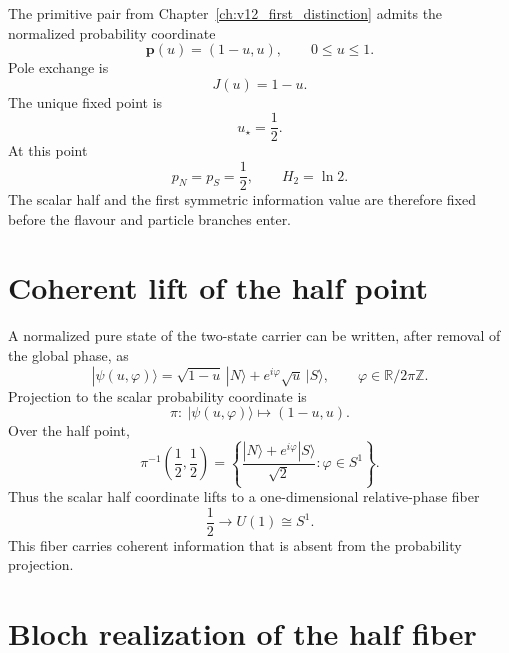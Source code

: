 The primitive pair from Chapter~\ref{ch:v12_first_distinction} admits the normalized probability coordinate
\begin{equation}
\mathbf p(u)=(1-u,u),
\qquad
0\le u\le1.
\end{equation}
Pole exchange is
\begin{equation}
J(u)=1-u.
\end{equation}
The unique fixed point is
\begin{equation}
\boxed{u_\star=\frac12.}
\label{eq:v12_half_point}
\end{equation}
At this point
\begin{equation}
p_N=p_S=\frac12,
\qquad
\boxed{H_2=\ln2.}
\label{eq:v12_half_entropy}
\end{equation}
The scalar half and the first symmetric information value are therefore fixed before the flavour and particle branches enter.

\section{Coherent lift of the half point}

A normalized pure state of the two-state carrier can be written, after removal of the global phase, as
\begin{equation}
|\psi(u,\varphi)\rangle
=\sqrt{1-u}\,|N\rangle
+e^{i\varphi}\sqrt{u}\,|S\rangle,
\qquad
\varphi\in\mathbb R/2\pi\mathbb Z.
\label{eq:v12_pure_binary_state}
\end{equation}
Projection to the scalar probability coordinate is
\begin{equation}
\pi:\ |\psi(u,\varphi)\rangle\longmapsto(1-u,u).
\end{equation}
Over the half point,
\begin{equation}
\boxed{
\pi^{-1}\!\left(\frac12,\frac12\right)
=
\left\{
\frac{|N\rangle+e^{i\varphi}|S\rangle}{\sqrt2}
:\varphi\in S^1
\right\}.
}
\label{eq:v12_half_fiber}
\end{equation}
Thus the scalar half coordinate lifts to a one-dimensional relative-phase fiber
\begin{equation}
\boxed{\frac12\longrightarrow U(1)\cong S^1.}
\end{equation}
This fiber carries coherent information that is absent from the probability projection.

\section{Bloch realization of the half fiber}

